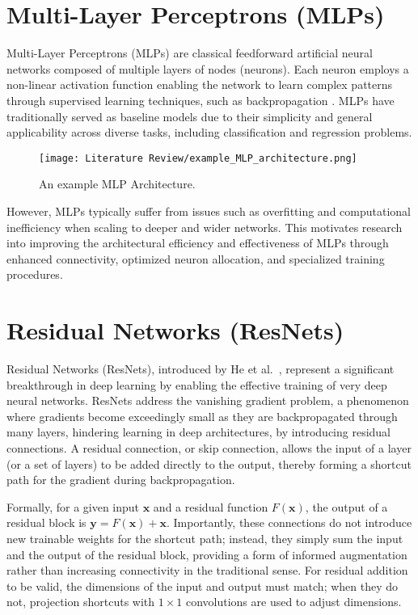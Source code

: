 
\section{Multi-Layer Perceptrons (MLPs)}
Multi-Layer Perceptrons (MLPs) are classical feedforward artificial neural networks composed of multiple layers of nodes (neurons). Each neuron employs a non-linear activation function enabling the network to learn complex patterns through supervised learning techniques, such as backpropagation \cite{rumelhart1986learning}. MLPs have traditionally served as baseline models due to their simplicity and general applicability across diverse tasks, including classification and regression problems.

\begin{figure}[h!]
    \centering
    \texttt{[image: Literature Review/example\_MLP\_architecture.png]}
    \caption{An example MLP Architecture.}
    \label{fig:exampleMLP}
\end{figure}

However, MLPs typically suffer from issues such as overfitting and computational inefficiency when scaling to deeper and wider networks. This motivates research into improving the architectural efficiency and effectiveness of MLPs through enhanced connectivity, optimized neuron allocation, and specialized training procedures.

\section{Residual Networks (ResNets)}

Residual Networks (ResNets), introduced by He et al.~\cite{he2016deep}, represent a significant breakthrough in deep learning by enabling the effective training of very deep neural networks. ResNets address the vanishing gradient problem, a phenomenon where gradients become exceedingly small as they are backpropagated through many layers, hindering learning in deep architectures, by introducing residual connections. A residual connection, or skip connection, allows the input of a layer (or a set of layers) to be added directly to the output, thereby forming a shortcut path for the gradient during backpropagation. 

Formally, for a given input $\mathbf{x}$ and a residual function $F(\mathbf{x})$, the output of a residual block is $\mathbf{y} = F(\mathbf{x}) + \mathbf{x}$. Importantly, these connections do not introduce new trainable weights for the shortcut path; instead, they simply sum the input and the output of the residual block, providing a form of informed augmentation rather than increasing connectivity in the traditional sense. For residual addition to be valid, the dimensions of the input and output must match; when they do not, projection shortcuts with $1 \times 1$ convolutions are used to adjust dimensions. 

